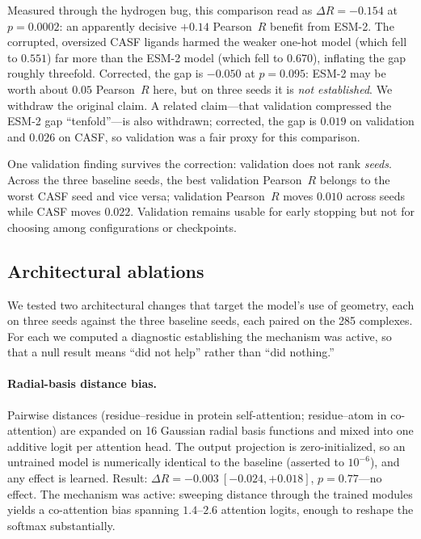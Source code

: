 \documentclass[11pt]{article}
\newcommand{\pearson}{Pearson~$R$}
\begin{document}
Measured through the hydrogen bug, this comparison read as $\Delta R = -0.154$ at
$p=0.0002$: an apparently decisive $+0.14$ \pearson{} benefit from ESM-2. The corrupted,
oversized CASF ligands harmed the weaker one-hot model (which fell to $0.551$) far more than
the ESM-2 model (which fell to $0.670$), inflating the gap roughly threefold. Corrected, the
gap is $-0.050$ at $p=0.095$: ESM-2 may be worth about $0.05$ \pearson{} here, but on three
seeds it is \emph{not established}. We withdraw the original claim. A related claim---that
validation compressed the ESM-2 gap ``tenfold''---is also withdrawn; corrected, the gap is
$0.019$ on validation and $0.026$ on CASF, so validation was a fair proxy for this
comparison.

One validation finding survives the correction: validation does not rank \emph{seeds}.
Across the three baseline seeds, the best validation \pearson{} belongs to the worst CASF
seed and vice versa; validation \pearson{} moves $0.010$ across seeds while CASF moves
$0.022$. Validation remains usable for early stopping but not for choosing among
configurations or checkpoints.

\subsection{Architectural ablations}
\label{sec:ablations}

We tested two architectural changes that target the model's use of geometry, each on three
seeds against the three baseline seeds, each paired on the 285 complexes. For each we
computed a diagnostic establishing the mechanism was active, so that a null result means
``did not help'' rather than ``did nothing.''

\paragraph{Radial-basis distance bias.} Pairwise distances (residue--residue in protein
self-attention; residue--atom in co-attention) are expanded on 16 Gaussian radial basis
functions and mixed into one additive logit per attention head. The output projection is
zero-initialized, so an untrained model is numerically identical to the baseline (asserted
to $10^{-6}$), and any effect is learned. Result: $\Delta R = -0.003\ [-0.024, +0.018]$,
$p=0.77$---no effect. The mechanism was active: sweeping distance through the trained
modules yields a co-attention bias spanning $1.4$--$2.6$ attention logits, enough to reshape
the softmax substantially.
\end{document}
